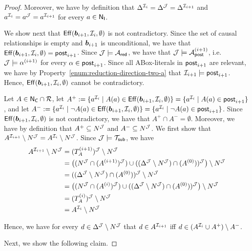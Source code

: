 \begin{proof}
    Moreover, we have by definition that
    $\Delta^{\mathcal{I}_i}=\Delta^\mathcal{J}=\Delta^{\mathcal{I}_{i+1}}$ and
    $a^{\mathcal{I}_i}=a^\mathcal{J}=a^{\mathcal{I}_{i+1}}$ for every $a\in\mathsf{N_I}$.

    We show next that $\operatorname{\mathsf{Eff}}(\boldsymbol b_{i+1},\mathcal{I}_i,\emptyset)$ is not contradictory.
    Since the set of causal relationships is empty and $\boldsymbol b_{i+1}$ is
    unconditional, we have that $\operatorname{\mathsf{Eff}}(\boldsymbol b_{i+1},\mathcal{I}_i,\emptyset)=\mathsf{post}_{i+1}$.
    Since $\mathcal{J}\models\mathcal{A}_\mathsf{red}$, we have that $\mathcal{J}\models\mathcal{A}_\mathsf{post}^{(i+1)}$,
    i.e.~$\mathcal{J}\models\alpha^{(i+1)}$ for every $\alpha\in\mathsf{post}_{i+1}$.  Since
    all ABox-literals in $\mathsf{post}_{i+1}$ are relevant, we have by
    Property~\eqref{enum:reduction-direction-two-a} that
    $\mathcal{I}_{i+1}\models\mathsf{post}_{i+1}$.  Hence, $\operatorname{\mathsf{Eff}}(\boldsymbol b_{i+1},\mathcal{I}_i,\emptyset)$
    cannot be contradictory.

    Let $A\in\mathsf{N_C}\cap\mathcal{R}$, let
    $A^+:=\{a^{\Imc_i}\mid A(a)\in\Eff(\bbf_{i+1},\Imc_i,\emptyset)\}%
        =\{a^{\Imc_i}\mid A(a)\in\post_{i+1}\}$, and let
    $A^-:=\{a^{\Imc_i}\mid\lnot A(a)\in\Eff(\bbf_{i+1},\Imc_i,\emptyset)\}%
        =\{a^{\Imc_i}\mid\lnot A(a)\in\post_{i+1}\}$.
    Since $\operatorname{\mathsf{Eff}}(\boldsymbol b_{i+1},\mathcal{I}_i,\emptyset)$ is not contradictory, we have that
    $A^+\cap A^-=\emptyset$.  Moreover, we have by definition that
    $A^+\subseteq N^\mathcal{J}$ and $A^-\subseteq N^\mathcal{J}$.
    We first show that
    $A^{\mathcal{I}_{i+1}}\setminus N^\mathcal{J}=A^{\mathcal{I}_i}\setminus N^\mathcal{J}$.  Since
    $\mathcal{J}\models\mathcal{T}_\mathsf{sub}$, we have
    \begin{align*}
        A^{\mathcal{I}_{i+1}}\setminus N^\mathcal{J}
        &=(T_A^{(i+1)})^\mathcal{J}\setminus N^\mathcal{J}\\
        &=\bigl((N^\mathcal{J}\cap(A^{(i+1)})^\mathcal{J})\cup((\Delta^\mathcal{J}\setminus N^\mathcal{J})\cap(A^{(0)}))^\mathcal{J}\bigr)\setminus N^\mathcal{J}\\
        &=((\Delta^\mathcal{J}\setminus N^\mathcal{J})\cap(A^{(0)}))^\mathcal{J}\setminus N^\mathcal{J}\\
        &=\bigl((N^\mathcal{J}\cap(A^{(i)})^\mathcal{J})\cup((\Delta^\mathcal{J}\setminus N^\mathcal{J})\cap(A^{(0)}))^\mathcal{J}\bigr)\setminus N^\mathcal{J}\\
        &=(T_A^{(i)})^\mathcal{J}\setminus N^\mathcal{J}\\
        &=A^{\mathcal{I}_i}\setminus N^\mathcal{J}
    \end{align*}

    \noindent
    Hence, we have for every $d\in\Delta^\mathcal{J}\setminus N^\mathcal{J}$ that
    $d\in A^{\mathcal{I}_{i+1}}$ iff $d\in(A^{\mathcal{I}_i}\cup A^+)\setminus A^-$.

    Next, we show the following claim.


\end{proof}
